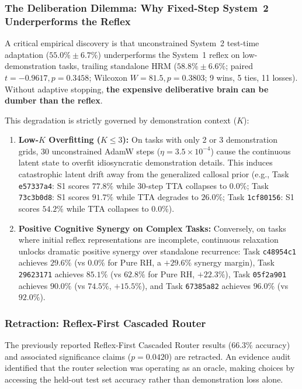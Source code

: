 \documentclass[11pt,a4paper]{article}
\theoremstyle{plain}
\theoremstyle{definition}
\theoremstyle{remark}
\begin{document}
\subsubsection{The Deliberation Dilemma: Why Fixed-Step System~2 Underperforms the Reflex}

A critical empirical discovery is that unconstrained System~2 test-time adaptation ($55.0\% \pm 6.7\%$) underperforms the System~1 reflex on low-demonstration tasks, trailing standalone HRM ($58.8\% \pm 6.6\%$; paired $t = -0.9617, p = 0.3458$; Wilcoxon $W = 81.5, p = 0.3803$; 9 wins, 5 ties, 11 losses). Without adaptive stopping, \textbf{the expensive deliberative brain can be dumber than the reflex}.

This degradation is strictly governed by demonstration context ($K$):
\begin{enumerate}
    \item \textbf{Low-$K$ Overfitting ($K \le 3$):} On tasks with only 2 or 3 demonstration grids, 30 unconstrained AdamW steps ($\eta = 3.5 \times 10^{-4}$) cause the continuous latent state to overfit idiosyncratic demonstration details. This induces catastrophic latent drift away from the generalized callosal prior (e.g., Task \texttt{e57337a4}: S1 scores $77.8\%$ while 30-step TTA collapses to $0.0\%$; Task \texttt{73c3b0d8}: S1 scores $91.7\%$ while TTA degrades to $26.0\%$; Task \texttt{1cf80156}: S1 scores $54.2\%$ while TTA collapses to $0.0\%$).
    \item \textbf{Positive Cognitive Synergy on Complex Tasks:} Conversely, on tasks where initial reflex representations are incomplete, continuous relaxation unlocks dramatic positive synergy over standalone recurrence: Task \texttt{c48954c1} achieves \textbf{$29.6\%$} (vs $0.0\%$ for Pure RH, a $+29.6\%$ synergy margin), Task \texttt{29623171} achieves \textbf{$85.1\%$} (vs $62.8\%$ for Pure RH, $+22.3\%$), Task \texttt{05f2a901} achieves \textbf{$90.0\%$} (vs $74.5\%$, $+15.5\%$), and Task \texttt{67385a82} achieves \textbf{$96.0\%$} (vs $92.0\%$).
\end{enumerate}

\subsubsection{Retraction: Reflex-First Cascaded Router}
\label{sec:retraction_router}
The previously reported Reflex-First Cascaded Router results ($66.3\%$ accuracy) and associated significance claims ($p = 0.0420$) are retracted. An evidence audit identified that the router selection was operating as an oracle, making choices by accessing the held-out test set accuracy rather than demonstration loss alone.
\end{document}
